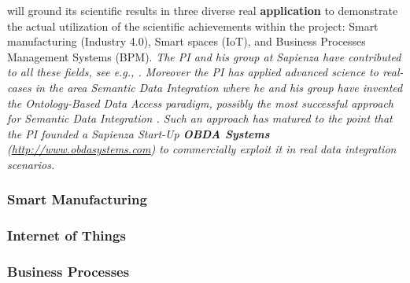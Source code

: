 \project will ground its scientific results in three
diverse real \textbf{application} to demonstrate the actual utilization of the scientific
achievements within the project: Smart manufacturing (Industry 4.0),
 Smart spaces (IoT), and
Business Processes Management Systems (BPM).
\emph{The PI and his group at Sapienza have
contributed to all these fields, see e.g.,
\cite{DeGiacomoCFHM12,DeGiacomoDMM15,SilvaFCLSR17}.  Moreover the PI
has applied advanced science to real-cases in the
area Semantic Data Integration where he and his group have invented the Ontology-Based Data Access paradigm, possibly the
most successful approach for Semantic Data Integration \cite{PoggiLCGLR08,SequedaM17,Statoil17}.
Such an approach has matured to the point that  the PI
founded a Sapienza Start-Up \textbf{OBDA Systems}
(\url{http://www.obdasystems.com}) to commercially exploit it in real data integration scenarios. }


\subsubsection{Smart Manufacturing}

\subsubsection{Internet of Things}

\subsubsection{Business Processes}
% 




